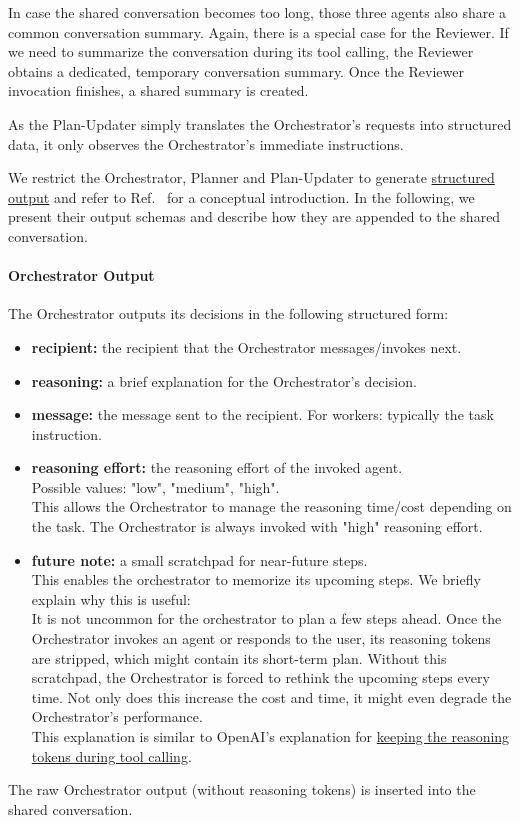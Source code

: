\documentclass[submission, Phys]{SciPost}
\begin{document}
In case the shared conversation becomes too long, those three agents also share a common conversation summary. Again, there is a special case for the Reviewer. If we need to summarize the conversation during its tool calling, the Reviewer obtains a dedicated, temporary conversation summary. Once the Reviewer invocation finishes, a shared summary is created.

As the Plan-Updater simply translates the Orchestrator's requests into structured data, it only observes the Orchestrator's immediate instructions.

We restrict the Orchestrator, Planner and Plan-Updater to generate \href{https://platform.openai.com/docs/guides/structured-outputs?utm_source=chatgpt.com}{structured output} and refer to Ref.~\cite{geng2023grammar} for a conceptual introduction. In the following, we present their output schemas and describe how they are appended to the shared conversation.

\paragraph{Orchestrator Output}

The Orchestrator outputs its decisions in the following structured form:
\begin{itemize}
    \item \textbf{recipient:} the recipient that the Orchestrator messages/invokes next.
    \item \textbf{reasoning:} a brief explanation for the Orchestrator's decision.
    \item \textbf{message:} the message sent to the recipient. For workers: typically the task instruction.
    \item \textbf{reasoning effort:} the reasoning effort of the invoked agent.\\
    Possible values: "low", "medium", "high".\\
    This allows the Orchestrator to manage the reasoning time/cost depending on the task. The Orchestrator is always invoked with "high" reasoning effort.
    \item \textbf{future note:} a small scratchpad for near-future steps.\\
    This enables the orchestrator to memorize its upcoming steps. We briefly explain why this is useful:\\
    It is not uncommon for the orchestrator to plan a few steps ahead. Once the Orchestrator invokes an agent or responds to the user, its reasoning tokens are stripped, which might contain its short-term plan. Without this scratchpad, the Orchestrator is forced to rethink the upcoming steps every time. Not only does this increase the cost and time, it might even degrade the Orchestrator's performance.\\
    This explanation is similar to OpenAI's explanation for \href{https://platform.openai.com/docs/guides/reasoning#keeping-reasoning-items-in-context}{keeping the reasoning tokens during tool calling}.
\end{itemize}
The raw Orchestrator output (without reasoning tokens) is inserted into the shared conversation.
\end{document}
